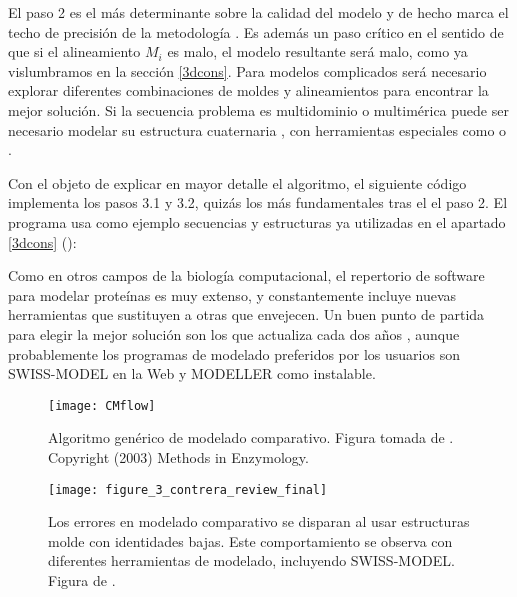 El paso 2 es el m\'{a}s determinante sobre la calidad del modelo y de hecho marca el techo de precisi\'{o}n de la metodolog\'{i}a 
\citep{ContrerasMoreira2005}. Es adem\'{a}s un paso cr\'{i}tico en el sentido de que si el alineamiento $M_{i}$ es malo, 
el modelo resultante ser\'{a} malo, como ya vislumbramos en la secci\'{o}n \ref{3dcons}. Para modelos complicados ser\'{a} 
necesario explorar diferentes combinaciones de moldes y alineamientos para encontrar la mejor soluci\'{o}n. %
Si la secuencia problema es multidominio o multim\'{e}rica puede ser necesario modelar su estructura cuaternaria \citep{Tramontano2017}, 
con herramientas especiales como
 o 
.

Con el objeto de explicar en mayor detalle el algoritmo, el siguiente c\'{o}digo implementa los pasos 3.1 y 3.2, quiz\'{a}s
los m\'{a}s fundamentales tras el el paso 2. El programa usa como ejemplo secuencias
y estructuras ya utilizadas en el apartado \ref{3dcons} ():


Como en otros campos de la biolog\'{i}a computacional, el repertorio de software para modelar prote\'{i}nas es muy extenso,
y constantemente incluye nuevas herramientas que sustituyen a otras que envejecen.
Un buen punto de partida para elegir la mejor soluci\'{o}n son los  que actualiza cada dos a\~nos 
, aunque probablemente los 
programas de modelado preferidos por los usuarios son SWISS-MODEL en la Web y MODELLER como instalable.

\begin{figure}
\begin{center} 
\texttt{[image: CMflow]}
\caption%
{
Algoritmo gen\'{e}rico de modelado comparativo.
Figura tomada de \citet{Fiser2003}. Copyright (2003) Methods in Enzymology.
}
\label{fig:CMflow}
\end{center}
\end{figure}

\begin{figure}
\begin{center} 
\texttt{[image: figure\_3\_contrera\_review\_final]}
\caption%
{
Los errores en modelado comparativo se disparan al usar estructuras molde con identidades bajas.
Este comportamiento se observa con diferentes herramientas de modelado, incluyendo SWISS-MODEL.
Figura de \citet{Contreras-Moreira2002b}. 
}
\label{fig:CMbench}
\end{center}
\end{figure}

